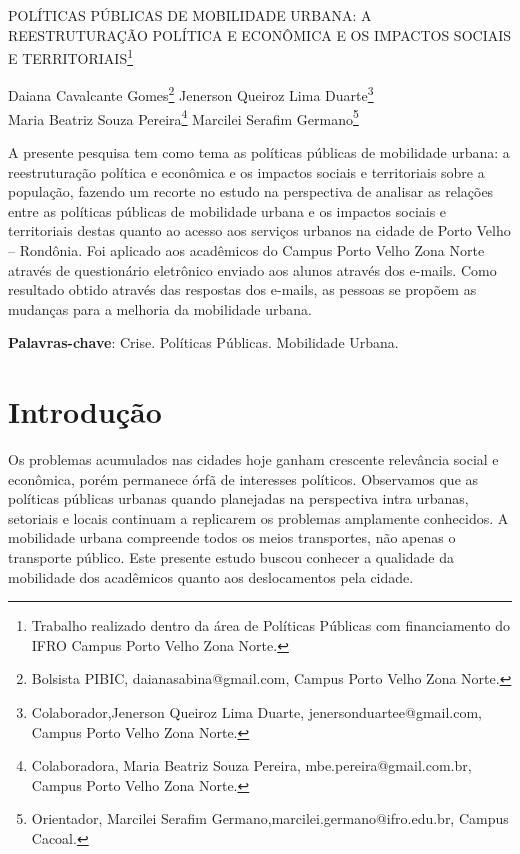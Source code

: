 \documentclass[article,12pt,onesidea,4paper,english,brazil]{abntex2}
\begin{document}
	
	
	\frenchspacing 
	
	\begin{center}
		\LARGE POLÍTICAS PÚBLICAS DE MOBILIDADE URBANA: A REESTRUTURAÇÃO POLÍTICA E ECONÔMICA E OS IMPACTOS SOCIAIS E TERRITORIAIS\footnote{Trabalho realizado dentro da área de Políticas Públicas com financiamento do IFRO Campus Porto Velho Zona Norte.}
		
		\normalsize
	Daiana Cavalcante Gomes\footnote{Bolsista PIBIC, daianasabina@gmail.com, Campus Porto Velho Zona Norte.} 
	Jenerson Queiroz Lima Duarte\footnote {Colaborador,Jenerson Queiroz Lima Duarte, jenersonduartee@gmail.com, Campus Porto Velho Zona Norte.} \\
	Maria Beatriz Souza Pereira\footnote{Colaboradora, Maria Beatriz Souza Pereira, mbe.pereira@gmail.com.br, Campus Porto Velho Zona
		Norte.} 
	Marcilei Serafim Germano\footnote{Orientador, Marcilei Serafim Germano,marcilei.germano@ifro.edu.br, Campus Cacoal.} 
	\end{center}
	
	\begin{resumoumacoluna}
	A presente pesquisa tem como tema as políticas públicas de mobilidade urbana: a reestruturação política e econômica e os impactos sociais e territoriais sobre a população, fazendo um recorte no estudo na perspectiva de analisar as relações entre as políticas públicas de mobilidade urbana e os impactos sociais e territoriais destas quanto ao acesso aos serviços urbanos na cidade de Porto Velho
	– Rondônia. Foi aplicado aos acadêmicos do Campus Porto Velho Zona Norte através de questionário eletrônico enviado aos alunos através dos e-mails. Como resultado obtido através das respostas dos e-mails, as pessoas se propõem as mudanças para a melhoria da mobilidade urbana.
		
		\vspace{\onelineskip}
		
		\noindent
		\textbf{Palavras-chave}: Crise. Políticas Públicas. Mobilidade Urbana.
	\end{resumoumacoluna}
	
	\section*{Introdução}
	
	Os problemas acumulados nas cidades hoje ganham crescente relevância social e econômica, porém permanece órfã de interesses políticos. Observamos que as políticas públicas urbanas quando planejadas na perspectiva intra urbanas, setoriais e locais continuam a replicarem os problemas amplamente conhecidos. A mobilidade urbana compreende todos os meios transportes, não apenas o transporte público. Este presente estudo buscou conhecer a qualidade da mobilidade dos acadêmicos quanto aos deslocamentos pela cidade.
	
\end{document}
